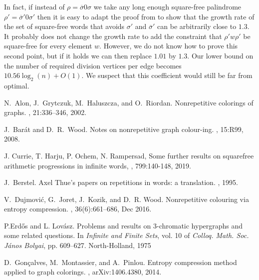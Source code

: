 \documentclass[a4paper,12pt]{article}
\newcommand{\pal}{\rho}
\newcommand{\hpal}{\sigma}
\begin{document}
In fact, if instead of $\pal=\overline{\hpal} 0 \hpal$ we take any long enough square-free palindrome $\pal'=\overline{\hpal}' 0 \hpal'$ then it is easy to adapt the proof from \cite{shursqf} to show that the growth rate of the set of square-free words that avoids $\hpal'$ and $\overline{\hpal}'$ can be arbitrarily close to $1.3$. It probably does not change the growth rate to add the constraint that $\pal' w\pal'$ be square-free for every element $w$. However, we do not know how to prove this second point, but if it holds we can then replace $1.01$ by $1.3$. Our lower bound on the number of required division vertices per edge becomes $10.56 \log_2(n)+ O(1)$. We suspect that this coefficient would still be far from optimal.




\begin{thebibliography}{1}

N.~Alon, J.~Grytczuk, M.~Haluszcza, and O.~Riordan.
\newblock Nonrepetitive colorings of graphs.
, 21:336--346, 2002.

J.~Barát and D.~R.~Wood.  
\newblock Notes on nonrepetitive graph colour-ing.
, 15:R99, 2008.

J. Currie, T. Harju, P. Ochem, N. Rampersad,
\newblock Some further results on squarefree arithmetic progressions in infinite words,
, 799:140-148, 2019.


J.~Berstel.
\newblock Axel {T}hue's papers on repetitions in words: a translation.
, 1995.

V.~Dujmovi{\'{c}}, G.~Joret, J.~Kozik, and D.~R. Wood.
\newblock Nonrepetitive colouring via entropy compression.
, 36(6):661--686, Dec 2016.

P.Erdős   and   L.  Lovász.
\newblock Problems  and  results  on 3-chromatic hypergraphs  and  some  related  questions.
\newblock  In {\em Infinite   and   Finite   Sets}, vol. 10 of {\em Colloq.  Math.  Soc.  János  Bolyai}, pp. 609–627. North-Holland, 1975

D.~Gon\c{c}alves, M.~Montassier, and A.~Pinlou.
\newblock Entropy compression method applied to graph colorings.
, arXiv:1406.4380, 2014.


\end{thebibliography}
\end{document}
